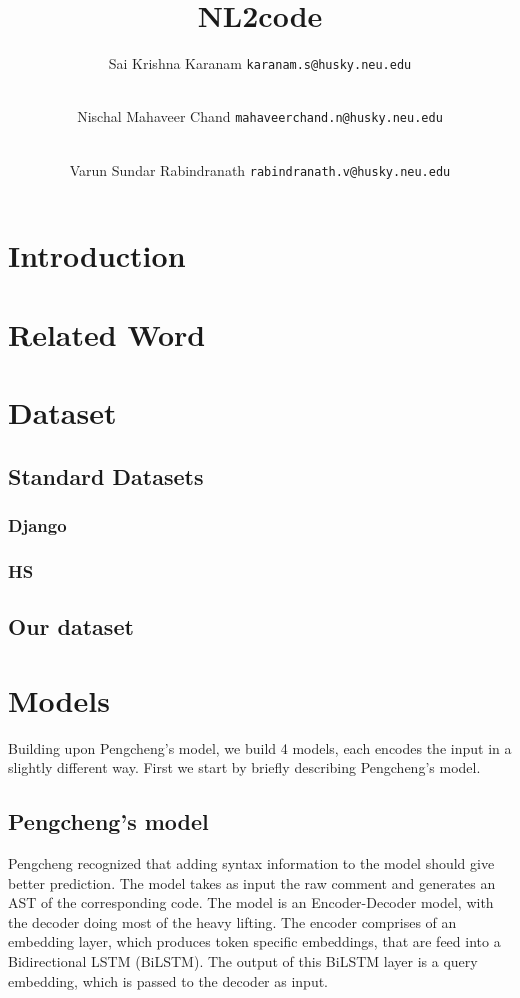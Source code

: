 \documentclass{IEEEtran}
\title{\textbf{NL2code}}
\author{
    Sai Krishna Karanam 
    \texttt{karanam.s@husky.neu.edu}
    \and \\
    Nischal Mahaveer Chand 
    \texttt{mahaveerchand.n@husky.neu.edu}
    \and \\
    Varun Sundar Rabindranath 
    \texttt{rabindranath.v@husky.neu.edu}
}
\date{}
\begin{document}
    \maketitle

    \section{Introduction}
    \blindtext

    \section{Related Word}
    \blindtext

    \section{Dataset}
      \subsection{Standard Datasets}
        \blindtext
        \subsubsection{Django}
        \blindtext
        \subsubsection{HS}
        \blindtext
      \subsection{Our dataset}
      \blindtext

    \section{Models}
    Building upon Pengcheng's model, we build 4 models, each encodes the input in a slightly 
    different way. First we start by briefly describing Pengcheng's model.

      \subsection{Pengcheng's model}
      Pengcheng recognized that adding syntax information to the model should give better
      prediction. The model takes as input the raw comment and generates an AST of the 
      corresponding code. The model is an Encoder-Decoder model, with the decoder doing most 
      of the heavy lifting. The encoder comprises of an embedding layer, which produces token
      specific embeddings, that are feed into a Bidirectional LSTM (BiLSTM). The output of this 
      BiLSTM layer is a query embedding, which is passed to the decoder as input. \\
\end{document}
